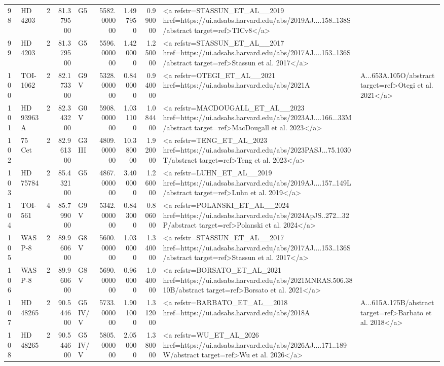 \begin{tabular}{llrrlrrrl}
98 & HD 4203 & 2 & 81.379500 & G5 & 5582.000000 & 1.497950 & 0.990000 & <a refstr=STASSUN_ET_AL__2019 href=https://ui.adsabs.harvard.edu/abs/2019AJ....158..138S/abstract target=ref>TICv8</a> \\
99 & HD 4203 & 2 & 81.379500 & G5 & 5596.000000 & 1.420000 & 1.250000 & <a refstr=STASSUN_ET_AL__2017 href=https://ui.adsabs.harvard.edu/abs/2017AJ....153..136S/abstract target=ref>Stassun et al. 2017</a> \\
100 & TOI-1062 & 2 & 82.173300 & G9 V & 5328.000000 & 0.840000 & 0.940000 & <a refstr=OTEGI_ET_AL__2021 href=https://ui.adsabs.harvard.edu/abs/2021A&A...653A.105O/abstract target=ref>Otegi et al. 2021</a> \\
101 & HD 93963 A & 2 & 82.343200 & G0 V & 5908.000000 & 1.031100 & 1.084400 & <a refstr=MACDOUGALL_ET_AL__2023 href=https://ui.adsabs.harvard.edu/abs/2023AJ....166...33M/abstract target=ref>MacDougall et al. 2023</a> \\
102 & 75 Cet & 2 & 82.961300 & G3 III & 4809.000000 & 10.380000 & 1.920000 & <a refstr=TENG_ET_AL_2023 href=https://ui.adsabs.harvard.edu/abs/2023PASJ...75.1030T/abstract target=ref>Teng et al. 2023</a> \\
103 & HD 75784 & 2 & 85.432100 & G5 & 4867.000000 & 3.400000 & 1.260000 & <a refstr=LUHN_ET_AL__2019 href=https://ui.adsabs.harvard.edu/abs/2019AJ....157..149L/abstract target=ref>Luhn et al. 2019</a> \\
104 & TOI-561 & 4 & 85.799000 & G9 V & 5342.000000 & 0.843000 & 0.806000 & <a refstr=POLANSKI_ET_AL__2024 href=https://ui.adsabs.harvard.edu/abs/2024ApJS..272...32P/abstract target=ref>Polanski et al. 2024</a> \\
105 & WASP-8 & 2 & 89.960600 & G8 V & 5600.000000 & 1.030000 & 1.340000 & <a refstr=STASSUN_ET_AL__2017 href=https://ui.adsabs.harvard.edu/abs/2017AJ....153..136S/abstract target=ref>Stassun et al. 2017</a> \\
106 & WASP-8 & 2 & 89.960600 & G8 V & 5690.000000 & 0.960000 & 1.040000 & <a refstr=BORSATO_ET_AL_2021 href=https://ui.adsabs.harvard.edu/abs/2021MNRAS.506.3810B/abstract target=ref>Borsato et al. 2021</a> \\
107 & HD 48265 & 2 & 90.544600 & G5 IV/V & 5733.000000 & 1.901000 & 1.312000 & <a refstr=BARBATO_ET_AL__2018 href=https://ui.adsabs.harvard.edu/abs/2018A&A...615A.175B/abstract target=ref>Barbato et al. 2018</a> \\
108 & HD 48265 & 2 & 90.544600 & G5 IV/V & 5805.000000 & 2.050000 & 1.380000 & <a refstr=WU_ET_AL_2026 href=https://ui.adsabs.harvard.edu/abs/2026AJ....171..189W/abstract target=ref>Wu et al. 2026</a> \\

\end{tabular}
